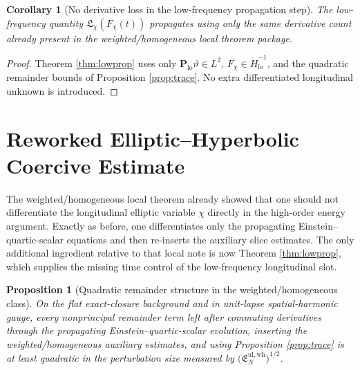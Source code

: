 \documentclass[11pt]{article}
\newtheorem{proposition}{Proposition}
\newtheorem{corollary}{Corollary}
\begin{document}
\begin{corollary}[No derivative loss in the low-frequency propagation step]
\label{cor:noloss}
The low-frequency quantity \(\mathfrak L_\chi(F_\chi(t))\) propagates using only the same derivative count already present in the weighted/homogeneous local theorem package.
\end{corollary}

\begin{proof}
Theorem \ref{thm:lowprop} uses only \(\mathbf P_{\mathrm{lo}}\vartheta\in L^2\), \(F_\chi\in \dot H^{-1}_{\mathrm{lo}}\), and the quadratic remainder bounds of Proposition \ref{prop:trace}. No extra differentiated longitudinal unknown is introduced.
\end{proof}

\section{Reworked Elliptic--Hyperbolic Coercive Estimate}

The weighted/homogeneous local theorem already showed that one should not differentiate the longitudinal elliptic variable \(\chi\) directly in the high-order energy argument. Exactly as before, one differentiates only the propagating Einstein--quartic-scalar equations and then re-inserts the auxiliary slice estimates. The only additional ingredient relative to that local note is now Theorem \ref{thm:lowprop}, which supplies the missing time control of the low-frequency longitudinal slot.

\begin{proposition}[Quadratic remainder structure in the weighted/homogeneous class]
\label{prop:quadratic}
On the flat exact-closure background and in unit-lapse spatial-harmonic gauge, every nonprincipal remainder term left after commuting derivatives through the propagating Einstein--quartic-scalar evolution, inserting the weighted/homogeneous auxiliary estimates, and using Proposition \ref{prop:trace} is at least quadratic in the perturbation size measured by \(\bigl(\mathfrak E_N^{\mathrm{ul,wh}}\bigr)^{1/2}\).
\end{proposition}
\end{document}
